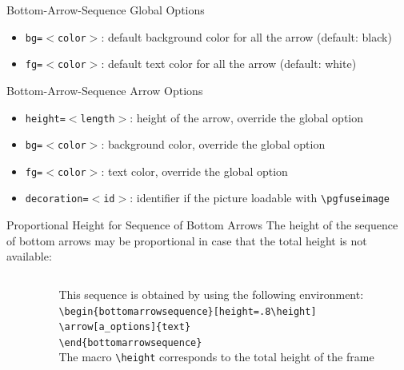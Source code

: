 \documentclass[english,sectioncirclenumberstyle]{ciadbeamer}
\begin{document}
\begin{frame}{{Bottom-Arrow-Sequence} Global Options \insertcontinuationtext}
	\begin{itemize}
	\item \texttt{bg=\ensuremath{<}color\ensuremath{>}}: default background color for all the arrow (default: black)
	\item \texttt{fg=\ensuremath{<}color\ensuremath{>}}: default text color for all the arrow (default: white)
	\end{itemize}
\end{frame}

\begin{frame}{{Bottom-Arrow-Sequence} Arrow Options}
	\begin{itemize}
	\item \texttt{height=\ensuremath{<}length\ensuremath{>}}: height of the arrow, override the global option
	\item \texttt{bg=\ensuremath{<}color\ensuremath{>}}: background color, override the global option
	\item \texttt{fg=\ensuremath{<}color\ensuremath{>}}: text color, override the global option
	\item \texttt{decoration=\ensuremath{<}id\ensuremath{>}}: identifier if the picture loadable with \texttt{{\textbackslash}pgfuseimage}
	\end{itemize}
\end{frame}

\begin{frame}[t]{{Proportional Height} for Sequence of Bottom Arrows}
	The height of the sequence of bottom arrows may be proportional in case that the total height is not available:
	\vspace{.5cm}
	\begin{columns}
		\begin{column}{.2\linewidth}
			\begin{bottomarrowsequence}[height=.8\height]
			\end{bottomarrowsequence} \\[.5cm]
		\end{column}
		\begin{column}{.8\linewidth}
			This sequence is obtained by using the following environment: \\
			\texttt{{\textbackslash}begin\{bottomarrowsequence\}[height=.8{\textbackslash}height]} \\
			\hspace{.5cm}\texttt{{\textbackslash}arrow[a\_options]\{text\}} \\
			\texttt{{\textbackslash}end\{bottomarrowsequence\}} \\[.5cm]
			The macro \texttt{{\textbackslash}height} corresponds to the total height of the frame
		\end{column}
	\end{columns}
\end{frame}
\end{document}
